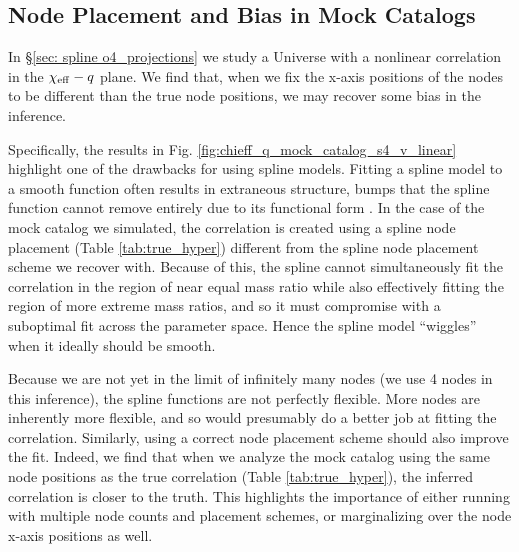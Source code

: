 \begin{refsection}
\subsection{Node Placement and Bias in Mock Catalogs}
\label{app:node_placement_bias}
In \S \ref{sec: spline o4_projections} we study a Universe with a nonlinear correlation in the $\chi_{\rm eff}-q$ plane. We find that, when we fix the x-axis positions of the nodes to be different than the true node positions, we may recover some bias in the inference.

Specifically, the results in Fig. \ref{fig:chieff_q_mock_catalog_s4_v_linear} highlight one of the drawbacks for using spline models. Fitting a spline model to a smooth function often results in extraneous structure, bumps that the spline function cannot remove entirely due to its functional form \cite{Farah:2023vsc}. In the case of the mock catalog we simulated, the correlation is created using a spline node placement (Table \ref{tab:true_hyper}) different from the spline node placement scheme we recover with. Because of this, the spline cannot simultaneously fit the correlation in the region of near equal mass ratio while also effectively fitting the region of more extreme mass ratios, and so it must compromise with a suboptimal fit across the parameter space. Hence the spline model ``wiggles'' when it ideally should be smooth.  %

Because we are not yet in the limit of infinitely many nodes (we use 4 nodes in this inference), the spline functions are not perfectly flexible. More nodes are inherently more flexible, and so would presumably do a better job at fitting the correlation. Similarly, using a correct node placement scheme should also improve the fit. Indeed, we find that when we analyze the mock catalog using the same node positions as the true correlation (Table \ref{tab:true_hyper}), the inferred correlation is closer to the truth. This highlights the importance of either running with multiple node counts and placement schemes, or marginalizing over the node x-axis positions as well.




\printbibliography[heading=subbibliography]
\end{refsection}

